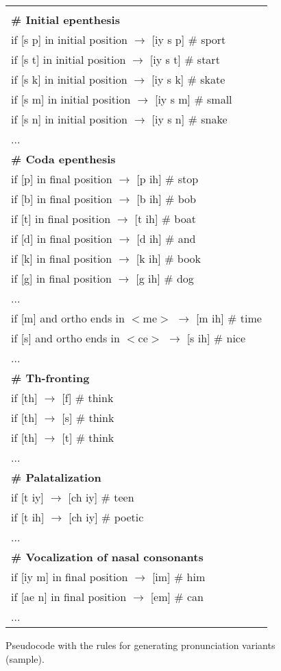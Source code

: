 \documentclass[twocolumn]{bmcart}%
\begin{document}
\begin{figure}[!ht]
  \caption{
      Pseudocode with the rules for generating pronunciation variants (sample).}
      \label{pseudocode-rules}
\small
\begin{tabular}{l} \hline
\small
\\ 
\textbf{\# Initial epenthesis} \\
if [s p] in initial position $\rightarrow$ [iy s p] \# sport \\
if [s t] in initial position $\rightarrow$ [iy s t] \# start \\
if [s k] in initial position $\rightarrow$ [iy s k] \# skate \\
if [s m] in initial position $\rightarrow$ [iy s m] \# small \\
if [s n] in initial position $\rightarrow$ [iy s n] \# snake \\
 ...  \\
\textbf{\# Coda epenthesis} \\
if [p] in final position $\rightarrow$ [p ih] \# stop \\
if [b] in final position $\rightarrow$ [b ih] \# bob \\
if [t] in final position $\rightarrow$ [t ih] \# boat \\
if [d] in final position $\rightarrow$ [d ih] \# and \\ 
if [k] in final position $\rightarrow$ [k ih] \# book \\
if [g] in final position $\rightarrow$ [g ih] \# dog \\
 ...  \\
if [m] and ortho ends in $<$me$>$ $\rightarrow$ [m ih] \# time \\
if [s] and ortho ends in $<$ce$>$ $\rightarrow$ [s ih] \# nice \\
 ...  \\
\textbf{\# Th-fronting} \\
if [th] $\rightarrow$ [f] \# think \\
if [th] $\rightarrow$ [s] \# think \\
if [th] $\rightarrow$ [t] \# think \\
... \\
\textbf{\# Palatalization} \\
if [t iy] $\rightarrow$ [ch iy] \# teen \\
if [t ih] $\rightarrow$ [ch iy] \# poetic \\
 ... \\
\textbf{\# Vocalization of nasal consonants} \\
if [iy m] in final position $\rightarrow$ [im] \# him \\
if [ae n] in final position $\rightarrow$ [em] \# can \\
... \\
\end{tabular}
\end{figure}
\end{document}
